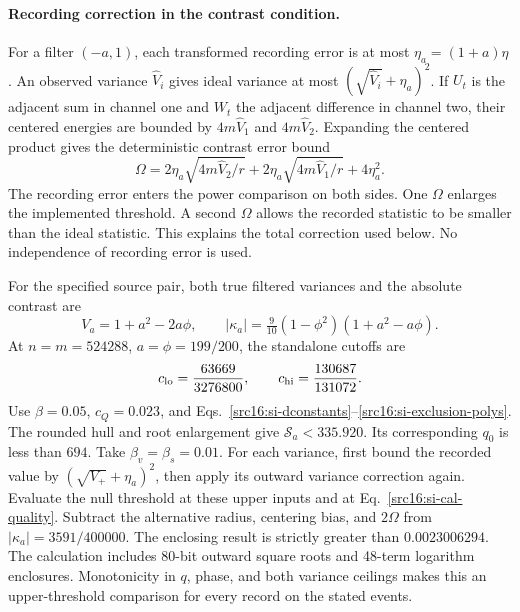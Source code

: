 \paragraph{Recording correction in the contrast condition.}
For a filter $(-a,1)$, each transformed recording error is at most $\eta_a=(1+a)\eta$. An observed variance $\widehat V_i$ gives ideal variance at most $(\sqrt{\widehat V_i}+\eta_a)^2$. If $U_t$ is the adjacent sum in channel one and $W_t$ the adjacent difference in channel two, their centered energies are bounded by $4m\widehat V_1$ and $4m\widehat V_2$. Expanding the centered product gives the deterministic contrast error bound
\begin{equation}\label{src16:si-contrast-error}
 \Omega=2\eta_a\sqrt{4m\widehat V_2/r}
       +2\eta_a\sqrt{4m\widehat V_1/r}+4\eta_a^2.
\end{equation}
The recording error enters the power comparison on both sides. One $\Omega$ enlarges the implemented threshold. A second $\Omega$ allows the recorded statistic to be smaller than the ideal statistic. This explains the total correction used below. No independence of recording error is used.

For the specified source pair, both true filtered variances and the absolute contrast are
\[
 V_a=1+a^2-2a\phi,\qquad
 |\kappa_a|=\tfrac9{10}(1-\phi^2)(1+a^2-a\phi).
\]
At $n=m=524288$, $a=\phi=199/200$, the standalone cutoffs are
\begin{equation}\label{src16:si-power-cutoffs}
 c_{\rm lo}=\frac{63669}{3276800},\qquad
 c_{\rm hi}=\frac{130687}{131072}.
\end{equation}
Use $\beta=0.05$, $c_Q=0.023$, and Eqs.~\eqref{src16:si-dconstants}--\eqref{src16:si-exclusion-polys}. The rounded hull and root enlargement give $\mathcal S_a<335.920$. Its corresponding $q_0$ is less than $694$. Take $\beta_v=\beta_s=0.01$. For each variance, first bound the recorded value by $(\sqrt{V_+}+\eta_a)^2$, then apply its outward variance correction again. Evaluate the null threshold at these upper inputs and at Eq.~\eqref{src16:si-cal-quality}. Subtract the alternative radius, centering bias, and $2\Omega$ from $|\kappa_a|=3591/400000$. The enclosing result is strictly greater than $0.0023006294$. The calculation includes 80-bit outward square roots and 48-term logarithm enclosures. Monotonicity in $q$, phase, and both variance ceilings makes this an upper-threshold comparison for every record on the stated events.

